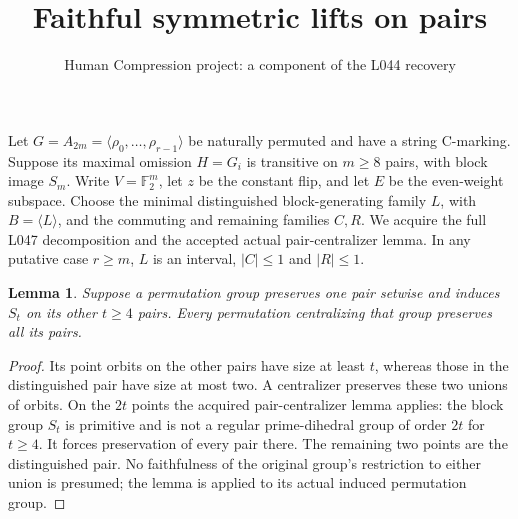 \documentclass[11pt,a4paper]{article}
\title{Faithful symmetric lifts on pairs}
\author{Human Compression project: a component of the L044 recovery}
\date{}
\newtheorem{lemma}{Lemma}
\newcommand{\gen}[1]{\langle#1\rangle}
\begin{document}
\maketitle
Let $G=A_{2m}=\gen{\rho_0,\ldots,\rho_{r-1}}$ be naturally
permuted and have a string C-marking. Suppose its maximal
omission $H=G_i$ is transitive on $m\ge8$ pairs, with block
image $S_m$. Write $V=\mathbb F_2^m$, let $z$ be the constant
flip, and let $E$ be the even-weight subspace. Choose the
minimal distinguished block-generating family $L$, with
$B=\gen L$, and the commuting and remaining families $C,R$.
We acquire the full L047 decomposition and the accepted actual
pair-centralizer lemma. In any putative case $r\ge m$, $L$
is an interval, $|C|\le1$ and $|R|\le1$.

\begin{lemma}\label{onefixed}
Suppose a permutation group preserves one pair setwise and
induces $S_t$ on its other $t\ge4$ pairs. Every permutation
centralizing that group preserves all its pairs.
\end{lemma}
\begin{proof}
Its point orbits on the other pairs have size at least $t$,
whereas those in the distinguished pair have size at most two.
A centralizer preserves these two unions of orbits.
On the $2t$ points the acquired pair-centralizer lemma applies:
the block group $S_t$ is primitive and is not a regular
prime-dihedral group of order $2t$ for $t\ge4$. It forces
preservation of every pair there. The remaining two points
are the distinguished pair. No faithfulness of the original
group's restriction to either union is presumed; the lemma
is applied to its actual induced permutation group.
\end{proof}
\end{document}
